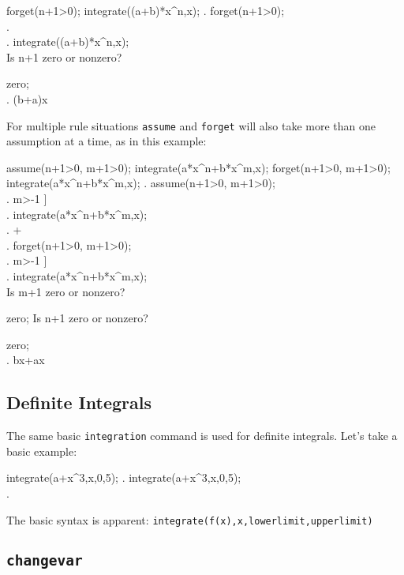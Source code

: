 \beginmaximasession
forget(n+1>0);
integrate((a+b)*x^n,x);
\maximatexsession
{}.  forget(n+1>0); \\
.  \left[ n>-1 \right] \\
.  integrate((a+b)*x^n,x); \\
\p
Is  n+1  zero or nonzero?

zero; \\
.  \left(b+a\right)\*\log x \\
\endmaximasession

For multiple rule situations {\tt assume} and {\tt forget} will also 
take more than one assumption at a time, as in this example:

\beginmaximasession
assume(n+1>0, m+1>0);
integrate(a*x^n+b*x^m,x);
forget(n+1>0, m+1>0);
integrate(a*x^n+b*x^m,x);
\maximatexsession
{}.  assume(n+1>0, m+1>0); \\
.  \left[ n>-1,\linebreak[0]m>-1 \right] \\
.  integrate(a*x^n+b*x^m,x); \\
.  + \\
.  forget(n+1>0, m+1>0); \\
.  \left[ n>-1,\linebreak[0]m>-1 \right] \\
.  integrate(a*x^n+b*x^m,x); \\
\p
Is  m+1  zero or nonzero?

zero;
Is  n+1  zero or nonzero?

zero; \\
.  b\*\log x+a\*\log x \\
\endmaximasession

\subsection{Definite Integrals}

The same basic {\tt integration} command is used for definite integrals.
Let's take a basic example:

\beginmaximasession
integrate(a+x^3,x,0,5);
\maximatexsession
{}.  integrate(a+x^3,x,0,5); \\
.   \\
\endmaximasession

The basic syntax is apparent: {\tt integrate(f(x),x,lowerlimit,upperlimit)}

\subsection{{\tt changevar}}

